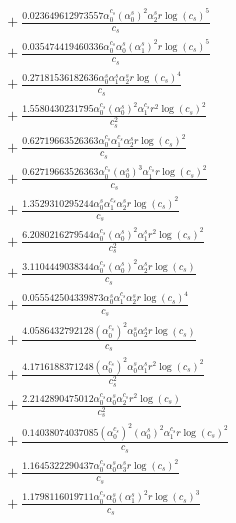 \documentclass[10pt]{article}
\begin{document}
\begin{align*}
&{}  + \frac{0.023649612973557 \alpha_{0}^{c_s} \left(\alpha_{0}^s\right)^{2} \alpha_{2}^s r \log{\left(c_{s} \right)}^{5}}{c_{s}} \\
&{}  + \frac{0.035474419460336 \alpha_{0}^{c_s} \alpha_{0}^s \left(\alpha_{1}^s\right)^{2} r \log{\left(c_{s} \right)}^{5}}{c_{s}} \\
&{}  + \frac{0.27181536182636 \alpha_{0}^s \alpha_{1}^s \alpha_{2}^s r \log{\left(c_{s} \right)}^{4}}{c_{s}} \\
&{}  + \frac{1.5580430231795 \alpha_{0}^{c_s} \left(\alpha_{0}^s\right)^{2} \alpha_{1}^{c_s} r^{2} \log{\left(c_{s} \right)}^{2}}{c_{s}^{2}} \\
&{}  + \frac{0.62719663526363 \alpha_{0}^{c_s} \alpha_{1}^{c_s} \alpha_{2}^s r \log{\left(c_{s} \right)}^{2}}{c_{s}} \\
&{}  + \frac{0.62719663526363 \alpha_{0}^{c_s} \left(\alpha_{0}^s\right)^{3} \alpha_{1}^{c_s} r \log{\left(c_{s} \right)}^{2}}{c_{s}} \\
&{}  + \frac{1.3529310295244 \alpha_{0}^s \alpha_{1}^{c_s} \alpha_{2}^s r \log{\left(c_{s} \right)}^{2}}{c_{s}} \\
&{}  + \frac{6.2080216279544 \alpha_{0}^{c_s} \left(\alpha_{0}^s\right)^{2} \alpha_{1}^s r^{2} \log{\left(c_{s} \right)}^{2}}{c_{s}^{2}} \\
&{}  + \frac{3.1104449038344 \alpha_{0}^{c_s} \left(\alpha_{0}^s\right)^{2} \alpha_{2}^s r \log{\left(c_{s} \right)}}{c_{s}} \\
&{}  + \frac{0.055542504339873 \alpha_{0}^s \alpha_{1}^{c_s} \alpha_{2}^s r \log{\left(c_{s} \right)}^{4}}{c_{s}} \\
&{}  + \frac{4.0586432792128 \left(\alpha_{0}^{c_s}\right)^{2} \alpha_{0}^s \alpha_{2}^s r \log{\left(c_{s} \right)}}{c_{s}} \\
&{}  + \frac{4.1716188371248 \left(\alpha_{0}^{c_s}\right)^{2} \alpha_{0}^s \alpha_{1}^s r^{2} \log{\left(c_{s} \right)}^{2}}{c_{s}^{2}} \\
&{}  + \frac{2.2142890475012 \alpha_{0}^{c_s} \alpha_{0}^s \alpha_{2}^{c_s} r^{2} \log{\left(c_{s} \right)}}{c_{s}^{2}} \\
&{}  + \frac{0.14038074037085 \left(\alpha_{0}^{c_s}\right)^{2} \left(\alpha_{0}^s\right)^{2} \alpha_{1}^{c_s} r \log{\left(c_{s} \right)}^{2}}{c_{s}} \\
&{}  + \frac{1.1645322290437 \alpha_{0}^{c_s} \alpha_{0}^s \alpha_{3}^s r \log{\left(c_{s} \right)}^{2}}{c_{s}} \\
&{}  + \frac{1.1798116019711 \alpha_{0}^{c_s} \alpha_{0}^s \left(\alpha_{1}^s\right)^{2} r \log{\left(c_{s} \right)}^{3}}{c_{s}} \\

\end{align*}
\end{document}
